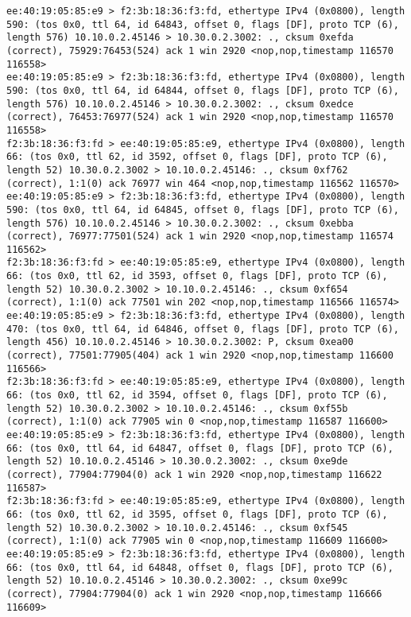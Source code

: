 \documentclass[a4paper,12pt]{article}
\begin{document}
\begin{Verbatim}
ee:40:19:05:85:e9 > f2:3b:18:36:f3:fd, ethertype IPv4 (0x0800), length 590: (tos 0x0, ttl 64, id 64843, offset 0, flags [DF], proto TCP (6), length 576) 10.10.0.2.45146 > 10.30.0.2.3002: ., cksum 0xefda (correct), 75929:76453(524) ack 1 win 2920 <nop,nop,timestamp 116570 116558>
ee:40:19:05:85:e9 > f2:3b:18:36:f3:fd, ethertype IPv4 (0x0800), length 590: (tos 0x0, ttl 64, id 64844, offset 0, flags [DF], proto TCP (6), length 576) 10.10.0.2.45146 > 10.30.0.2.3002: ., cksum 0xedce (correct), 76453:76977(524) ack 1 win 2920 <nop,nop,timestamp 116570 116558>
f2:3b:18:36:f3:fd > ee:40:19:05:85:e9, ethertype IPv4 (0x0800), length 66: (tos 0x0, ttl 62, id 3592, offset 0, flags [DF], proto TCP (6), length 52) 10.30.0.2.3002 > 10.10.0.2.45146: ., cksum 0xf762 (correct), 1:1(0) ack 76977 win 464 <nop,nop,timestamp 116562 116570>
ee:40:19:05:85:e9 > f2:3b:18:36:f3:fd, ethertype IPv4 (0x0800), length 590: (tos 0x0, ttl 64, id 64845, offset 0, flags [DF], proto TCP (6), length 576) 10.10.0.2.45146 > 10.30.0.2.3002: ., cksum 0xebba (correct), 76977:77501(524) ack 1 win 2920 <nop,nop,timestamp 116574 116562>
f2:3b:18:36:f3:fd > ee:40:19:05:85:e9, ethertype IPv4 (0x0800), length 66: (tos 0x0, ttl 62, id 3593, offset 0, flags [DF], proto TCP (6), length 52) 10.30.0.2.3002 > 10.10.0.2.45146: ., cksum 0xf654 (correct), 1:1(0) ack 77501 win 202 <nop,nop,timestamp 116566 116574>
ee:40:19:05:85:e9 > f2:3b:18:36:f3:fd, ethertype IPv4 (0x0800), length 470: (tos 0x0, ttl 64, id 64846, offset 0, flags [DF], proto TCP (6), length 456) 10.10.0.2.45146 > 10.30.0.2.3002: P, cksum 0xea00 (correct), 77501:77905(404) ack 1 win 2920 <nop,nop,timestamp 116600 116566>
f2:3b:18:36:f3:fd > ee:40:19:05:85:e9, ethertype IPv4 (0x0800), length 66: (tos 0x0, ttl 62, id 3594, offset 0, flags [DF], proto TCP (6), length 52) 10.30.0.2.3002 > 10.10.0.2.45146: ., cksum 0xf55b (correct), 1:1(0) ack 77905 win 0 <nop,nop,timestamp 116587 116600>
ee:40:19:05:85:e9 > f2:3b:18:36:f3:fd, ethertype IPv4 (0x0800), length 66: (tos 0x0, ttl 64, id 64847, offset 0, flags [DF], proto TCP (6), length 52) 10.10.0.2.45146 > 10.30.0.2.3002: ., cksum 0xe9de (correct), 77904:77904(0) ack 1 win 2920 <nop,nop,timestamp 116622 116587>
f2:3b:18:36:f3:fd > ee:40:19:05:85:e9, ethertype IPv4 (0x0800), length 66: (tos 0x0, ttl 62, id 3595, offset 0, flags [DF], proto TCP (6), length 52) 10.30.0.2.3002 > 10.10.0.2.45146: ., cksum 0xf545 (correct), 1:1(0) ack 77905 win 0 <nop,nop,timestamp 116609 116600>
ee:40:19:05:85:e9 > f2:3b:18:36:f3:fd, ethertype IPv4 (0x0800), length 66: (tos 0x0, ttl 64, id 64848, offset 0, flags [DF], proto TCP (6), length 52) 10.10.0.2.45146 > 10.30.0.2.3002: ., cksum 0xe99c (correct), 77904:77904(0) ack 1 win 2920 <nop,nop,timestamp 116666 116609>

\end{Verbatim}
\end{document}

